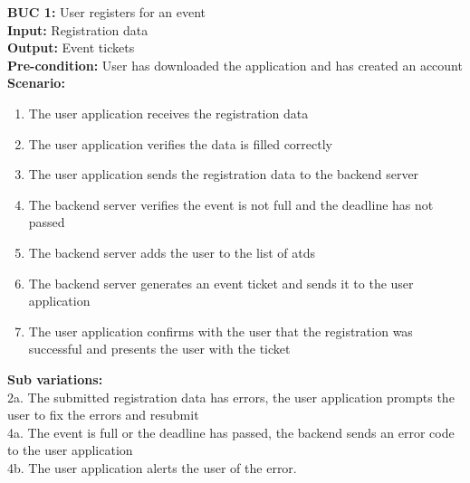 \documentclass[12pt]{article}
\begin{document}
\noindent\textbf{BUC 1: } User registers for an event \\
\textbf{Input:} Registration data \\
\textbf{Output:} Event tickets \\
\textbf{Pre-condition:} User has downloaded the application and has created an account \\
\textbf{Scenario:} \\
\begin{enumerate}
  \item The user application receives the registration data
  \item The user application verifies the data is filled correctly
  \item The user application sends the registration data to the backend server
  \item The backend server verifies the event is not full and the deadline has not passed
  \item The backend server adds the user to the list of \glspl{atd}
  \item The backend server generates an event ticket and sends it to the user application
  \item The user application confirms with the user that the registration was successful and presents the user with the ticket
\end{enumerate}
\textbf{Sub variations:} \\
2a. The submitted registration data has errors, the user application prompts the user to fix the errors and resubmit \\
4a. The event is full or the deadline has passed, the backend sends an error code to the user application \\
4b. The user application alerts the user of the error. \\
\end{document}
